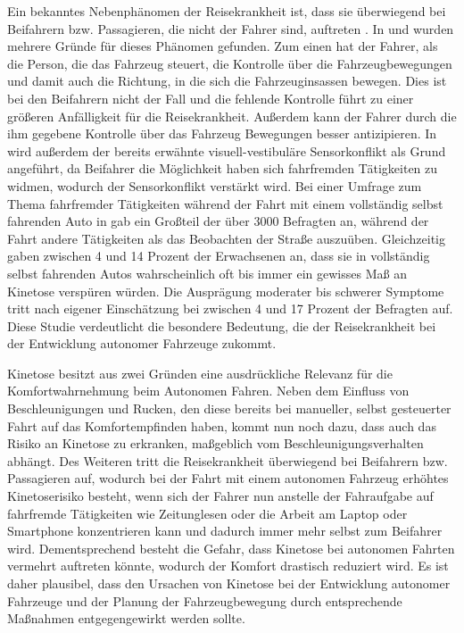Ein bekanntes Nebenphänomen der Reisekrankheit ist, dass sie überwiegend bei Beifahrern bzw. Passagieren, die nicht der Fahrer sind, auftreten \Cite{motion sickness reason}\Cite{Reason.1975}. In \cite{sivak motion sickness} und \cite{rolnick}\cite{Rolnick.1991} wurden mehrere Gründe für dieses Phänomen gefunden. Zum einen hat der Fahrer, als die Person, die das Fahrzeug steuert, die Kontrolle über die Fahrzeugbewegungen und damit auch die Richtung, in die sich die Fahrzeuginsassen bewegen. Dies ist bei den Beifahrern nicht der Fall und die fehlende Kontrolle führt zu einer größeren Anfälligkeit für die Reisekrankheit. Außerdem kann der Fahrer durch die ihm gegebene Kontrolle über das Fahrzeug Bewegungen besser antizipieren. In \cite{sivak motion sickness} wird außerdem der bereits erwähnte visuell-vestibuläre Sensorkonflikt als Grund angeführt, da Beifahrer die Möglichkeit haben sich fahrfremden Tätigkeiten zu widmen, wodurch der Sensorkonflikt verstärkt wird. Bei einer Umfrage zum Thema fahrfremder Tätigkeiten während der Fahrt mit einem vollständig selbst fahrenden Auto in \cite{sivak motion sickness} gab ein Großteil der über 3000 Befragten an, während der Fahrt andere Tätigkeiten als das Beobachten der Straße auszuüben. Gleichzeitig gaben zwischen 4 und 14 Prozent der Erwachsenen an, dass sie in vollständig selbst fahrenden Autos wahrscheinlich oft bis immer ein gewisses Maß an Kinetose verspüren würden. Die Ausprägung moderater bis schwerer Symptome tritt nach eigener Einschätzung bei zwischen 4 und 17 Prozent der Befragten auf. Diese Studie verdeutlicht die besondere Bedeutung, die der Reisekrankheit bei der Entwicklung autonomer Fahrzeuge zukommt. 

Kinetose besitzt aus zwei Gründen eine ausdrückliche Relevanz für die Komfortwahrnehmung beim Autonomen Fahren. Neben dem Einfluss von Beschleunigungen und Rucken, den diese bereits bei manueller, selbst gesteuerter Fahrt auf das Komfortempfinden haben, kommt nun noch dazu, dass auch das Risiko an Kinetose zu erkranken, maßgeblich vom Beschleunigungsverhalten abhängt. Des Weiteren tritt die Reisekrankheit überwiegend bei Beifahrern bzw. Passagieren auf, wodurch bei der Fahrt mit einem autonomen Fahrzeug erhöhtes Kinetoserisiko besteht, wenn sich der Fahrer nun anstelle der Fahraufgabe auf fahrfremde Tätigkeiten wie Zeitunglesen oder die Arbeit am Laptop oder Smartphone konzentrieren kann und dadurch immer mehr selbst zum Beifahrer wird. Dementsprechend besteht die Gefahr, dass Kinetose bei autonomen Fahrten vermehrt auftreten könnte, wodurch der Komfort drastisch reduziert wird. Es ist daher plausibel, dass den Ursachen von Kinetose bei der Entwicklung autonomer Fahrzeuge und der Planung der Fahrzeugbewegung durch entsprechende Maßnahmen entgegengewirkt werden sollte. 

